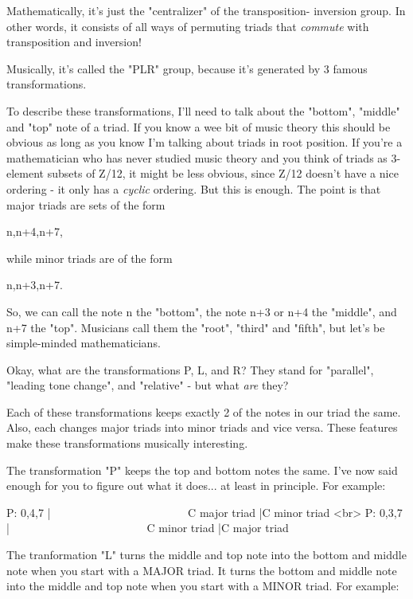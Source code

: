 Mathematically, it's just the "centralizer" of the transposition-
inversion group.   In other words, it consists of all ways of
permuting triads that \emph{commute} with transposition and inversion!

Musically, it's called the "PLR" group, because it's generated
by 3 famous transformations.  

To describe these transformations, I'll need to talk about the
"bottom", "middle" and "top" note of a
triad.  If you know a wee bit of music theory this should be obvious
as long as you know I'm talking about triads in root position.  If
you're a mathematician who has never studied music theory and you
think of triads as 3-element subsets of Z/12, it might be less
obvious, since Z/12 doesn't have a nice ordering - it only has a
\emph{cyclic} ordering.  But this is enough.  The point is that major
triads are sets of the form

{n,n+4,n+7}, 

while minor triads are of the form 

{n,n+3,n+7}.  

So, we can call the note n the "bottom", the note n+3 or n+4
the "middle", and n+7 the "top".  Musicians call
them the "root", "third" and "fifth",
but let's be simple-minded mathematicians.

Okay, what are the transformations P, L, and R?  They stand for
"parallel", "leading tone change", and
"relative" - but what \emph{are} they?

Each of these transformations keeps exactly 2 of the notes 
in our triad the same.  Also, each changes major triads into
minor triads and vice versa.  These features make these 
transformations musically interesting.

The transformation "P" keeps the top and bottom notes the same.
I've now said enough for you to figure out what it does... 
at least in principle.  For example:

P: {0,4,7} |         
\ \ \ \ \ \ \ \ \ \ \ \       
\ \ \ \ \ \ \ \ \ \ \ \       
    C major triad |\to  C minor triad <br>
P: {0,3,7} |\to  {0,4,7}        
\ \ \ \ \ \ \ \ \ \ \ \       
\ \ \ \ \ \ \ \ \ \ \ \       
     C minor triad |\to  C major triad

The tranformation "L" turns the middle and top note into the bottom
and middle note when you start with a MAJOR triad.  It turns the 
bottom and middle note into the middle and top note when you start 
with a MINOR triad.  For example:


